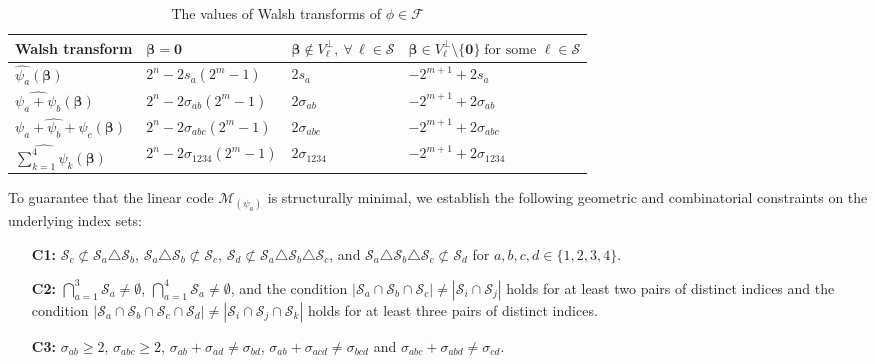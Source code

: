 \documentclass[10pt,a4paper]{amsart}
\begin{document}
\begin{table}[ht]
\centering
\caption{The values of Walsh transforms of $\phi \in \mathcal{F}$}
\label{Table_1}
\label{tab:walsh}
\renewcommand{\arraystretch}{1.0}
\begin{tabular}{|l|l|l|l|}
\hline
Walsh transform &
$\mathbf{\beta=0}$ &
$\mathbf{\beta} \notin V_\ell^\perp,\ \forall\, \ell \in \mathcal{S}$ &
$\mathbf{\beta}\in V_\ell^\perp\setminus\{\mathbf{0}\}\; \text{for some }\ell \in \mathcal{S}$ \\
\hline
$\widehat{\psi_a}(\mathbf{\beta})$ &
$2^n-2s_a(2^m-1)$ &
$2s_a$ &
$-2^{m+1}+2s_a$
\\
\hline
$\widehat{\psi_a+\psi_b}(\mathbf{\beta})$ &
$2^n-2\sigma_{ab}(2^m-1)$ &
$2\sigma_{ab}$ &
$-2^{m+1}+2\sigma_{ab}$
\\
\hline
$\widehat{\psi_a+\psi_b+\psi_c}(\mathbf{\beta})$ &
$2^n-2\sigma_{abc}(2^m-1)$ &
$2\sigma_{abc}$ &
$-2^{m+1}+2\sigma_{abc}$
\\
\hline
$\widehat{\displaystyle\sum_{k=1}^{4}\psi_k}(\mathbf{\beta})$ &
$2^n-2\sigma_{1234}(2^m-1)$ &
$2\sigma_{1234}$ &
$-2^{m+1}+2\sigma_{1234}$
\\
\hline
\end{tabular}
\end{table}

To guarantee that the linear code $\mathcal{M}_{(\psi_a)}$ is structurally minimal, we establish the following geometric and combinatorial constraints on the underlying index sets:

\begin{itemize}
    \item[\textbf{C1:}] $\mathcal{S}_c \not\subset \mathcal{S}_a \triangle \mathcal{S}_b$, $\mathcal{S}_a \triangle \mathcal{S}_b \not\subset \mathcal{S}_c$, $\mathcal{S}_d \not\subset \mathcal{S}_a \triangle \mathcal{S}_b \triangle \mathcal{S}_c$, and $\mathcal{S}_a \triangle \mathcal{S}_b \triangle \mathcal{S}_c \not\subset \mathcal{S}_d$ for  $a,b,c,d \in \{1,2,3,4\}$.
    \item[\textbf{C2:}] $\bigcap_{a=1}^3 \mathcal{S}_a \neq \emptyset$, $\bigcap_{a=1}^{4} \mathcal{S}_a \neq \emptyset$, and the condition $|\mathcal{S}_a \cap \mathcal{S}_b \cap \mathcal{S}_c| \neq |\mathcal{S}_i \cap \mathcal{S}_j|$ holds for at least two pairs of distinct indices and the condition $|\mathcal{S}_a \cap \mathcal{S}_b \cap \mathcal{S}_c \cap \mathcal{S}_d| \neq |\mathcal{S}_i \cap \mathcal{S}_j \cap \mathcal{S}_k|$ holds for at least three pairs of distinct indices.
    \item[\textbf{C3:}] $\sigma_{ab} \geq 2$, $\sigma_{abc} \geq 2$, $\sigma_{ab} + \sigma_{ad} \neq \sigma_{bd}$, $\sigma_{ab} + \sigma_{acd} \neq \sigma_{bcd}$ and $\sigma_{abc} + \sigma_{abd} \neq \sigma_{cd}$.
\end{itemize}
\end{document}
